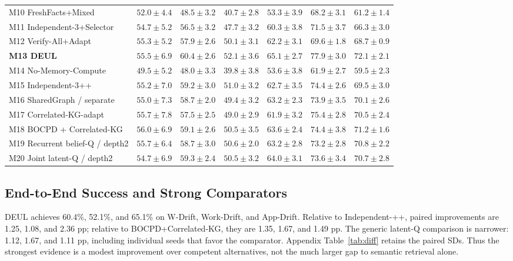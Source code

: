 \documentclass[sigconf,anonymous,review]{acmart}
\theoremstyle{zhplain}
\begin{document}
\begin{table}[t]
\begin{tabular}{@{}lrrrrrr@{}}
M10 FreshFacts+Mixed & \(52.0\!\pm\!4.4\) & \(48.5\!\pm\!3.2\) & \(40.7\!\pm\!2.8\) & \(53.3\!\pm\!3.9\) & \(68.2\!\pm\!3.1\) & \(61.2\!\pm\!1.4\) \\
M11 Independent-3+Selector & \(54.7\!\pm\!5.2\) & \(56.5\!\pm\!3.2\) & \(47.7\!\pm\!3.2\) & \(60.3\!\pm\!3.8\) & \(71.5\!\pm\!3.7\) & \(66.3\!\pm\!3.0\) \\
M12 Verify-All+Adapt & \(55.3\!\pm\!5.2\) & \(57.9\!\pm\!2.6\) & \(50.1\!\pm\!3.1\) & \(62.2\!\pm\!3.1\) & \(69.6\!\pm\!1.8\) & \(68.7\!\pm\!0.9\) \\
\textbf{M13 DEUL} & \(55.5\!\pm\!6.9\) & \(60.4\!\pm\!2.6\) & \(52.1\!\pm\!3.6\) & \(65.1\!\pm\!2.7\) & \(77.9\!\pm\!3.0\) & \(72.1\!\pm\!2.1\) \\
M14 No-Memory-Compute & \(49.5\!\pm\!5.2\) & \(48.0\!\pm\!3.3\) & \(39.8\!\pm\!3.8\) & \(53.6\!\pm\!3.8\) & \(61.9\!\pm\!2.7\) & \(59.5\!\pm\!2.3\) \\
M15 Independent-3++ & \(55.2\!\pm\!7.0\) & \(59.2\!\pm\!3.0\) & \(51.0\!\pm\!3.2\) & \(62.7\!\pm\!3.5\) & \(74.4\!\pm\!2.6\) & \(69.5\!\pm\!3.0\) \\
M16 SharedGraph / separate & \(55.0\!\pm\!7.3\) & \(58.7\!\pm\!2.0\) & \(49.4\!\pm\!3.2\) & \(63.2\!\pm\!2.3\) & \(73.9\!\pm\!3.5\) & \(70.1\!\pm\!2.6\) \\
M17 Correlated-KG-adapt & \(55.7\!\pm\!7.8\) & \(57.5\!\pm\!2.5\) & \(49.0\!\pm\!2.9\) & \(61.9\!\pm\!3.2\) & \(75.4\!\pm\!2.8\) & \(70.5\!\pm\!2.4\) \\
M18 BOCPD + Correlated-KG & \(56.0\!\pm\!6.9\) & \(59.1\!\pm\!2.6\) & \(50.5\!\pm\!3.5\) & \(63.6\!\pm\!2.4\) & \(74.4\!\pm\!3.8\) & \(71.2\!\pm\!1.6\) \\
M19 Recurrent belief-Q / depth2 & \(55.7\!\pm\!6.4\) & \(58.7\!\pm\!3.0\) & \(50.6\!\pm\!2.0\) & \(63.2\!\pm\!2.8\) & \(73.2\!\pm\!2.8\) & \(70.8\!\pm\!2.2\) \\
M20 Joint latent-Q / depth2 & \(54.7\!\pm\!6.9\) & \(59.3\!\pm\!2.4\) & \(50.5\!\pm\!3.2\) & \(64.0\!\pm\!3.1\) & \(73.6\!\pm\!3.4\) & \(70.7\!\pm\!2.8\) \\
\bottomrule
\end{tabular}
\end{table}

\subsection{End-to-End Success and Strong Comparators}
DEUL achieves 60.4\%, 52.1\%, and 65.1\% on W-Drift, Work-Drift, and App-Drift. Relative to Independent-++, paired improvements are 1.25, 1.08, and 2.36 pp; relative to BOCPD+\allowbreak Correlated-KG, they are 1.35, 1.67, and 1.49 pp. The generic latent-Q comparison is narrower: 1.12, 1.67, and 1.11 pp, including individual seeds that favor the comparator. Appendix Table~\ref{tab:diff} retains the paired SDs. Thus the strongest evidence is a modest improvement over competent alternatives, not the much larger gap to semantic retrieval alone.
\end{document}
